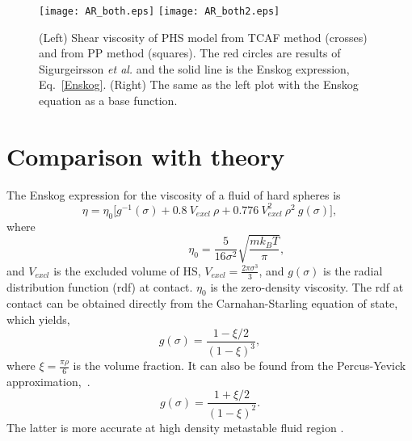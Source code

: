 \documentclass[preprint,pre,aps,superscriptaddress,a4paper]{revtex4}
\begin{document}
\begin{figure}
\centering
\texttt{[image: AR\_both.eps]}
\texttt{[image: AR\_both2.eps]}
\caption{ (Left) Shear viscosity of PHS model    from TCAF method (crosses) and from PP method (squares). The red circles are results of Sigurgeirsson {\it {et al.}} \cite{heyes:09:0} and the  solid line is the Enskog expression, Eq.~\ref{Enskog}. {  (Right) The same as the left plot with the Enskog equation as  a base function. }  }
\label{vis_TCAF}
\end{figure}    
\section{Comparison with theory}
The Enskog expression for the viscosity of a fluid of hard spheres is  \cite{Chapman:52:0,Santos:16:0,Viswanath:07:0,Sengers:00:0,Lucas:79:0}
\begin{equation}
\eta= \eta_0 \bigg [ g^{-1}(\sigma)+0.8 ~V_{excl}~ \rho + 0.776~ V^2_{excl} ~\rho^2 ~g(\sigma)\bigg],
\label{Enskog}
\end{equation} 
where 
\begin{equation}
\hspace{2cm} \eta_0=\frac{5}{16\sigma^2}\sqrt{\frac{mk_B T}{\pi}},
\label{ensk}
\end{equation} 
and $V_{excl} $ is the excluded volume of HS, $V_{excl}=\frac{2\pi\sigma^3}{3}$,  and $g(\sigma)$ is the  radial distribution function (rdf) at contact.  $\eta_0$ is the  zero-density viscosity.
The rdf at contact can be obtained directly from the Carnahan-Starling equation of state, which yields,
   \begin{equation}
g(\sigma) = \frac{1-\xi/2}{(1-\xi)^3},
\label{CS}
\end{equation} 
where $ \xi=\frac{\pi \rho }{6}$ is the volume fraction.
It can also be found from the Percus-Yevick  approximation,~\cite{yelash:01:00,yevick:58:00}.
   \begin{equation}
g(\sigma) = \frac{1+\xi/2}{(1-\xi)^2}.
\label{PY}
\end{equation} 
The latter  is more accurate at high density metastable fluid region \cite{heyes:09:0}.
\end{document}
